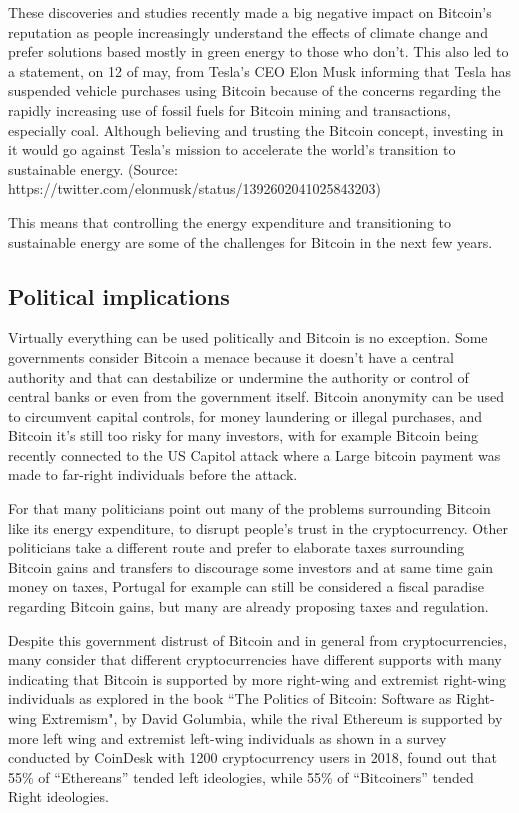 \documentclass{article}
\begin{document}
These discoveries and studies recently made a big negative impact on Bitcoin's reputation as people increasingly understand the effects of climate change and prefer solutions based mostly in green energy to those who don’t. This also led to a statement, on 12 of may, from Tesla's CEO Elon Musk informing that Tesla has suspended vehicle purchases using Bitcoin because of the concerns regarding the rapidly increasing use of fossil fuels for Bitcoin mining and transactions, especially coal. Although believing and trusting the Bitcoin concept, investing in it would go against Tesla’s mission to accelerate the world’s transition to sustainable energy. (Source: https://twitter.com/elonmusk/status/1392602041025843203)

This means that controlling the energy expenditure and transitioning to sustainable energy are some of the challenges for Bitcoin in the next few years.

\subsection{Political implications}

Virtually everything can be used politically and Bitcoin is no exception. Some governments consider Bitcoin a menace because it doesn't have a central authority and that can destabilize or undermine the authority or control of central banks or even from the government itself. Bitcoin anonymity can be used to circumvent capital controls, for money laundering or illegal purchases, and Bitcoin it’s still too risky for many investors, with for example Bitcoin being recently connected to the US Capitol attack where a Large bitcoin payment was made to far-right individuals before the attack.

For that many politicians point out many of the problems surrounding Bitcoin like its energy expenditure, to disrupt people's trust in the cryptocurrency. Other politicians take a different route and prefer to elaborate taxes surrounding Bitcoin gains and transfers to discourage some investors and at same time gain money on taxes, Portugal for example can still be considered a fiscal paradise regarding Bitcoin gains, but many are already proposing taxes and regulation.

Despite this government distrust of Bitcoin and in general from cryptocurrencies, many consider that different cryptocurrencies have different supports with many indicating that Bitcoin is supported by more right-wing and extremist right-wing individuals as explored in the book “The Politics of Bitcoin: Software as Right-wing Extremism", by David Golumbia, while the rival Ethereum is supported by more left wing and extremist left-wing individuals as shown in a survey conducted by CoinDesk with 1200 cryptocurrency users in 2018, found out that 55\% of “Ethereans” tended left ideologies, while 55\% of “Bitcoiners” tended Right ideologies.

\newpage

\nocite{*}
\printbibliography
\end{document}
